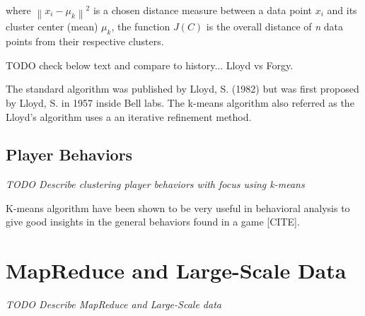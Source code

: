 where $\left \| x_i-\mu_k \right \|^2$ is a chosen distance measure between a data point $x_i$ and its cluster center (mean) $\mu_k$, the function $J(C)$ is the overall distance of \textit{n} data points from their respective clusters.


TODO check below text and compare to history... Lloyd vs Forgy.

The standard algorithm was published by Lloyd, S. (1982) \citep{Lloyd:1982} but was first proposed by Lloyd, S. in 1957 inside Bell labs. The k-means algorithm also referred as the Lloyd's algorithm uses a an iterative refinement method. 




\lipsum[5]

\subsection{Player Behaviors}
\textit{TODO Describe clustering player behaviors with focus using k-means}

K-means algorithm have been shown to be very useful in behavioral analysis to give good insights in the general behaviors found in a game [CITE].

\lipsum[6]


\section{MapReduce and Large-Scale Data}
\textit{TODO Describe MapReduce and Large-Scale data}

\lipsum[7-9]


